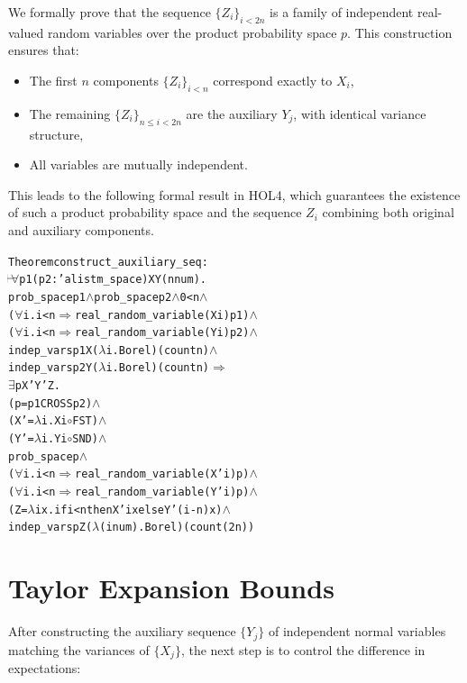 We formally prove that the sequence $\{Z_i\}_{i < 2n}$ is a family of independent real-valued random variables over the product probability space $p$. This construction ensures that:

\begin{itemize}
\item The first $n$ components $\{Z_i\}_{i < n}$ correspond exactly to $X_i$,
\item The remaining $\{Z_i\}_{n \leq i < 2n}$ are the auxiliary $Y_j$, with identical variance structure,
\item All variables are mutually independent.
\end{itemize}

This leads to the following formal result in HOL4, which guarantees the existence of such a product probability space and the sequence $Z_i$ combining both original and auxiliary components.

\begin{hol}
  \begin{alltt}
    Theorem construct\_auxiliary\_seq :
    \(\!\!\!{\turn}\!\!\!\!\) \(\forall\)p1 (p2 :'a list m\_space) X Y (n \:num).
    prob\_space p1 \(\land\) prob\_space p2 \(\land\) 0 < n \(\land\)
    (\(\forall\)i. i < n \(\Rightarrow\) real\_random\_variable (X i) p1) \(\land\)
    (\(\forall\)i. i < n \(\Rightarrow\) real\_random\_variable (Y i) p2) \(\land\)
    indep\_vars p1 X (\(\lambda\)i. Borel) (count n) \(\land\)
    indep\_vars p2 Y (\(\lambda\)i. Borel) (count n) \(\Rightarrow\)
    \(\exists\)p X' Y' Z.
    (p = p1 CROSS p2) \(\land\)
    (X' = \(\lambda\)i. X i \(\circ\) FST) \(\land\)
    (Y' = \(\lambda\)i. Y i \(\circ\) SND) \(\land\)
    prob\_space p \(\land\)
    (\(\forall\)i. i < n \(\Rightarrow\) real\_random\_variable (X' i) p) \(\land\)
    (\(\forall\)i. i < n \(\Rightarrow\) real\_random\_variable (Y' i) p) \(\land\)
    (Z = \(\lambda\)i x. if i < n then X' i x else Y' (i - n) x) \(\land\)
    indep\_vars p Z (\(\lambda\)(i \:num). Borel) (count (2 \* n))
  \end{alltt}
\end{hol}

\section {Taylor Expansion Bounds}

After constructing the auxiliary sequence $\{Y_j\}$ of independent normal variables matching the variances of $\{X_j\}$, the next step is to control the difference in expectations:

